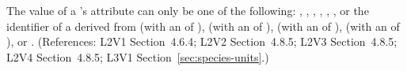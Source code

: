 The value of a \Species's  attribute can only be one of
the following: , , , ,
, , or the identifier of a
\UnitDefinition derived from  (with an  of
),  (with an  of ), 
(with an  of ),  (with an
 of ), or .  (References: L2V1
Section~4.6.4; L2V2 Section~4.8.5; L2V3 Section~4.8.5; L2V4 Section~4.8.5; 
L3V1 Section~\ref{sec:species-units}.)
